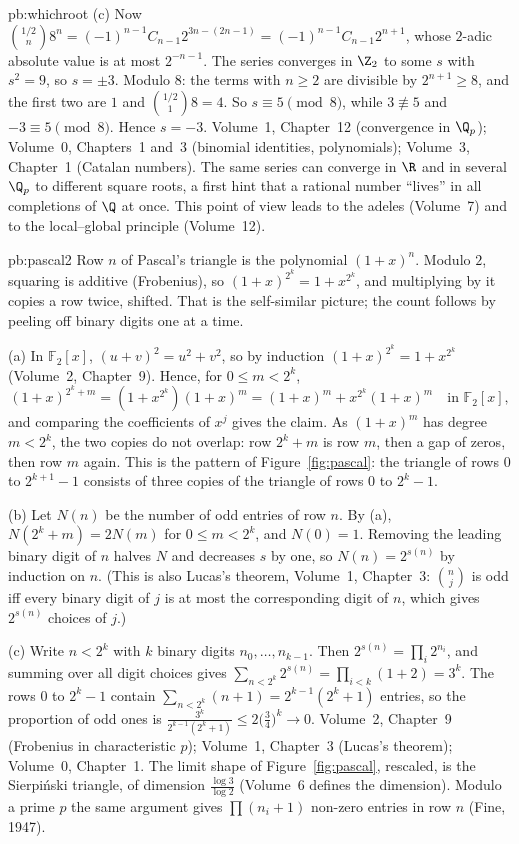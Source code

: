 \begin{solution}{pb:whichroot}
(c) Now $\binom{1/2}n8^n=(-1)^{n-1}C_{n-1}2^{3n-(2n-1)}=(-1)^{n-1}C_{n-1}2^{n+1}$, whose $2$-adic absolute value is at most
$2^{-n-1}$. The series converges in $\Z_2$ to some $s$ with $s^2=9$, so $s=\pm3$. Modulo $8$: the terms with $n\ge2$ are
divisible by $2^{n+1}\ge8$, and the first two are $1$ and $\binom{1/2}18=4$. So $s\equiv5\pmod8$, while $3\not\equiv5$ and
$-3\equiv5\pmod8$. Hence $s=-3$.
\tools Volume~1, Chapter~12 (convergence in $\Q_p$); Volume~0, Chapters~1 and~3 (binomial identities, polynomials); Volume~3,
Chapter~1 (Catalan numbers).
\leads The same series can converge in $\R$ and in several $\Q_p$ to different square roots, a first hint that a rational
number ``lives'' in all completions of $\Q$ at once. This point of view leads to the adeles (Volume~7) and to the local--global
principle (Volume~12).
\end{solution}

\begin{solution}{pb:pascal2}
\idea Row $n$ of Pascal's triangle is the polynomial $(1+x)^n$. Modulo $2$, squaring is additive (Frobenius), so
$(1+x)^{2^k}=1+x^{2^k}$, and multiplying by it copies a row twice, shifted. That is the self-similar picture; the count follows
by peeling off binary digits one at a time.

\writeup (a) In $\mathbb F_2[x]$, $(u+v)^2=u^2+v^2$, so by induction $(1+x)^{2^k}=1+x^{2^k}$ (Volume~2, Chapter~9). Hence, for
$0\le m<2^k$,
\[
(1+x)^{2^k+m}=(1+x^{2^k})(1+x)^m=(1+x)^m+x^{2^k}(1+x)^m\quad\text{in }\mathbb F_2[x],
\]
and comparing the coefficients of $x^j$ gives the claim. As $(1+x)^m$ has degree $m<2^k$, the two copies do not overlap: row
$2^k+m$ is row $m$, then a gap of zeros, then row $m$ again. This is the pattern of Figure~\ref{fig:pascal}: the triangle of
rows $0$ to $2^{k+1}-1$ consists of three copies of the triangle of rows $0$ to $2^k-1$.

(b) Let $N(n)$ be the number of odd entries of row $n$. By (a), $N(2^k+m)=2N(m)$ for $0\le m<2^k$, and $N(0)=1$. Removing the
leading binary digit of $n$ halves $N$ and decreases $s$ by one, so $N(n)=2^{s(n)}$ by induction on $n$. (This is also
Lucas's theorem, Volume~1, Chapter~3: $\binom nj$ is odd iff every binary digit of $j$ is at most the corresponding digit of
$n$, which gives $2^{s(n)}$ choices of $j$.)

(c) Write $n<2^k$ with $k$ binary digits $n_0,\dots,n_{k-1}$. Then $2^{s(n)}=\prod_i2^{n_i}$, and summing over all digit
choices gives $\sum_{n<2^k}2^{s(n)}=\prod_{i<k}(1+2)=3^k$. The rows $0$ to $2^k-1$ contain $\sum_{n<2^k}(n+1)=2^{k-1}(2^k+1)$
entries, so the proportion of odd ones is $\frac{3^k}{2^{k-1}(2^k+1)}\le2\bigl(\frac34\bigr)^k\to0$.
\tools Volume~2, Chapter~9 (Frobenius in characteristic $p$); Volume~1, Chapter~3 (Lucas's theorem); Volume~0, Chapter~1.
\leads The limit shape of Figure~\ref{fig:pascal}, rescaled, is the Sierpiński triangle, of dimension $\frac{\log3}{\log2}$
(Volume~6 defines the dimension). Modulo a prime $p$ the same argument gives $\prod(n_i+1)$ non-zero entries in row $n$ (Fine,
1947).
\end{solution}

